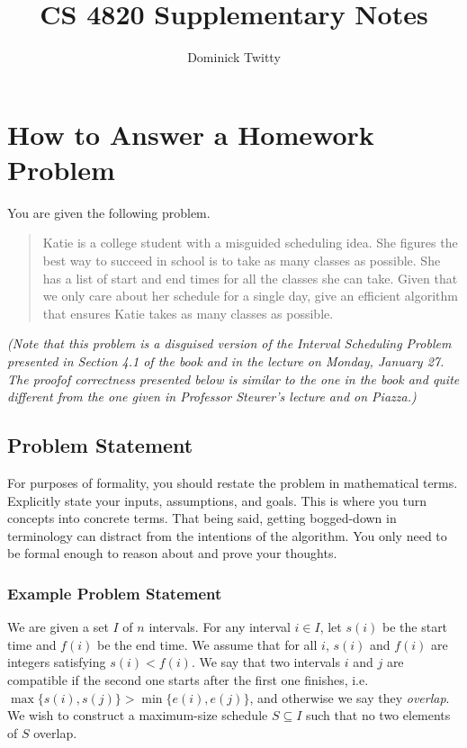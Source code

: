 \documentclass[12pt]{article}
\begin{document}
 
\title{CS 4820 Supplementary Notes}
\author{Dominick Twitty}
\maketitle


\section{How to Answer a Homework Problem}
You are given the following problem. 

\begin{quotation}
Katie is a college student with a misguided scheduling idea. She figures the best way to succeed in school is to take as many classes as possible. She has a list  of start and end times for all the classes she can take. Given that we only care about her schedule for a single day, give an efficient algorithm that ensures Katie takes as many classes as possible.
\end{quotation}

{\em (Note that this problem is a disguised
version of the Interval Scheduling Problem presented in Section 4.1 of the 
book and in the lecture on Monday, January 27. The proofof correctness
presented below is similar to the one in the book and quite different from
the one given in Professor Steurer's lecture and on Piazza.)}


\subsection{Problem Statement}
For purposes of formality, you should restate the problem in mathematical terms. Explicitly state your inputs, assumptions, and goals. This is where you turn concepts into concrete terms. That being said, getting bogged-down in terminology can distract from the intentions of the algorithm. You only need to be formal enough to reason about and prove your thoughts.

\subsubsection{Example Problem Statement}
We are given a set $I$ of $n$ intervals. For any interval $i \in I$, let $s(i)$ be the start time and $f(i)$ be the end time. We assume that for all $i$, $s(i)$ and $f(i)$ are integers satisfying $s(i) < f(i)$. We say that two intervals $i$ and $j$ are compatible if the second one starts after the first one finishes, i.e. $\max\{s(i),s(j)\} > \min\{e(i),e(j)\}$, and otherwise we say they \emph{overlap}. We wish to construct a maximum-size schedule $S \subseteq I$ such that no two elements of $S$ overlap.
\end{document}
